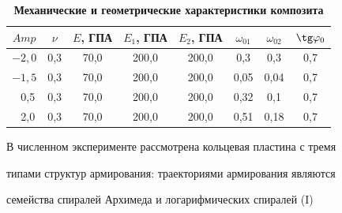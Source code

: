 \begin{table}[b!]






\centering \small

\begin{minipage}[t]{.78\textwidth} \small

\caption{\bf Механические и геометрические характеристики композита} \vspace{-3mm} \centering

\begin{tabular}{c|c|c|c|c|c|c|c}

\hline   

\footnotesize $Amp$ & \footnotesize $\nu$ &\footnotesize $E$, ГПА  & \footnotesize $E_1$, ГПА &  \footnotesize $E_2$, ГПА & \footnotesize $\omega_{01}$ & \footnotesize $\omega_{02}$ & \footnotesize $\tg \varphi_0$\\\hline

\rule{0mm}{12pt}%

  $-2{,}0$ & 0{,}3 & 70{,}0 & 200{,}0 & 200{,}0 & 0{,}3 & 0{,}3 & 0{,}7 \\

  $-1{,}5$ & 0{,}3 & 70{,}0 & 200{,}0 & 200{,}0 & 0{,}05 & 0{,}04 & 0{,}7 \\

 ~\,0{,}5 & 0{,}3 & 70{,}0 & 200{,}0 & 200{,}0 & 0{,}32 & 0{,}1 & 0{,}7 \\

 ~\,2{,}0 & 0{,}3 & 70{,}0 & 200{,}0 & 200{,}0 & 0{,}51 & 0{,}18 & 0{,}7 \\

\hline

\end{tabular} \label{nemfed:tab1}

\end{minipage}



\vspace{-5mm}



\end{table}



В численном эксперименте рассмотрена кольцевая пластина с тремя

типами структур  армирования:  траекториями армирования являются

семейства спиралей Архимеда и логарифмических спиралей (I)

